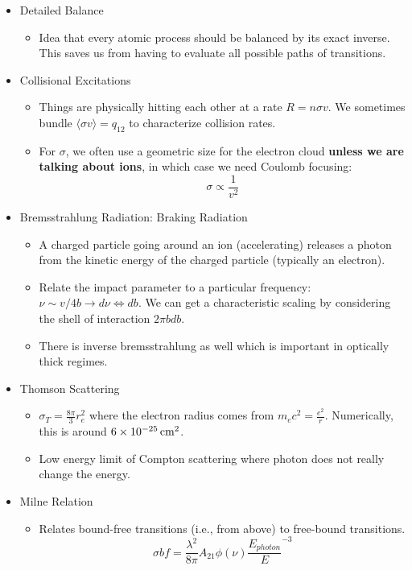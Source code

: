 \documentclass{article}
\newcommand{\unit}[1]{{\,\rm #1}}
\newcommand{\cm}{\unit{cm}}
\begin{document}
\begin{itemize}
    \item Detailed Balance
    \begin{itemize}
        \item Idea that every atomic process should be balanced by its exact inverse. This saves us from having to evaluate all possible paths of transitions.
    \end{itemize}
    
    \item Collisional Excitations
    \begin{itemize}
        \item Things are physically hitting each other at a rate $R = n \sigma v$. We sometimes bundle $\langle \sigma v \rangle = q_{12}$ to characterize collision rates. 
        \item For $\sigma$, we often use a geometric size for the electron cloud \textbf{unless we are talking about ions}, in which case we need Coulomb focusing:
        $$
        \sigma \propto \frac{1}{v^2}
        $$
    \end{itemize}
    
    \item Bremsstrahlung Radiation: Braking Radiation
    \begin{itemize}
        \item A charged particle going around an ion (accelerating) releases a photon from the kinetic energy of the charged particle (typically an electron). 
        \item Relate the impact parameter to a particular frequency: $\nu \sim v/4b \to d\nu \iff db$. We can get a characteristic scaling by considering the shell of interaction $2\pi b db$.
        \item There is inverse bremsstrahlung as well which is important in optically thick regimes. 
    \end{itemize}
    
    \item Thomson Scattering
    \begin{itemize}
        \item $\sigma_T = \frac{8\pi}{3} r_{e}^2$ where the electron radius comes from $m_e c^2 = \frac{e^2}{r}$. Numerically, this is around $6 \times 10^{-25} \cm^2$. 
        \item Low energy limit of Compton scattering where photon does not really change the energy. 
    \end{itemize}
    
    \item Milne Relation
    \begin{itemize}
        \item Relates bound-free transitions (i.e., from above) to free-bound transitions. 
        $$
        \sigma{bf} = \frac{\lambda^2}{8\pi} A_{21} \phi(\nu) \frac{E_{photon}}{E}^{-3}
        $$
        

\end{itemize}
\end{itemize}
\end{document}
